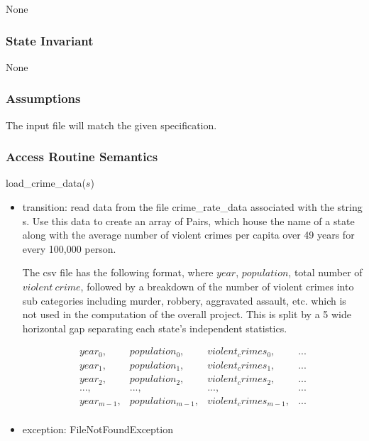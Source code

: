\documentclass[12pt]{article}
\begin{document}
None

\subsubsection* {State Invariant}

None

\subsubsection* {Assumptions}

The input file will match the given specification.

\subsubsection* {Access Routine Semantics}

\noindent load\_crime\_data($s$)
\begin{itemize}
\item transition: read data from the file crime\_rate\_data associated with the string s.
  Use this data to create an array of Pairs, which house the name of a state along with
  the average number of violent crimes per capita over 49 years for every 100,000 person.

  The csv file has the following format, where $year$, $population$, total number of $violent\ crime$,
  followed by a breakdown of the number of violent crimes into sub categories including murder, robbery, 
  aggravated assault, etc. which is not used in the computation of the overall project. This is split by a 5 wide
  horizontal gap separating each state's independent statistics. 

  \begin{equation}
    \begin{array}{cccc}
      year_0, & population_0, & violent_crimes_0, & . . . \\
      year_1, & population_1, & violent_crimes_1, & . . . \\
      year_2, & population_2, & violent_crimes_2, & . . . 
      \\
      ..., & ..., & ..., & ...
      \\
      year_{m-1}, & population_{m-1}, & violent_crimes_{m-1}, & . . . \\
    \end{array}
  \end{equation}

\item exception: FileNotFoundException
\end{itemize}
\newpage
\end{document}
